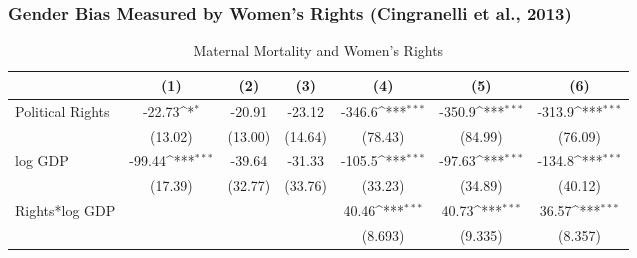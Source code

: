 \documentclass[10pt,letterpaper,subeqn]{beamer}
\begin{document}
\begin{frame}
\frametitle{Gender Bias Measured by  Women's Rights  (Cingranelli et al., 2013)}
%
\begin{table}[htbp]\centering
\def\sym#1{\ifmmode^{#1}\else\(^{#1}\)\fi}
\caption{Maternal Mortality and Women's Rights \label{MMRbWRightWDINew}}
\scriptsize
\begin{tabular}{l*{6}{c}}
\hline\hline
            &\multicolumn{1}{c}{(1)}&\multicolumn{1}{c}{(2)}&\multicolumn{1}{c}{(3)}&\multicolumn{1}{c}{(4)}&\multicolumn{1}{c}{(5)}&\multicolumn{1}{c}{(6)}\\
\hline
Political Rights      &      -22.73\sym{*}  &      -20.91         &      -23.12         &      -346.6\sym{***}&      -350.9\sym{***}&      -313.9\sym{***}\\
            &     (13.02)         &     (13.00)         &     (14.64)         &     (78.43)         &     (84.99)         &     (76.09)         \\

log GDP         &      -99.44\sym{***}&      -39.64         &      -31.33         &      -105.5\sym{***}&      -97.63\sym{***}&      -134.8\sym{***}\\
            &     (17.39)         &     (32.77)         &     (33.76)         &     (33.23)         &     (34.89)         &     (40.12)         \\


Rights*log GDP  &                     &                     &                     &       40.46\sym{***}&       40.73\sym{***}&       36.57\sym{***}\\
            &                     &                     &                     &     (8.693)         &     (9.335)         &     (8.357)         \\



\end{tabular}
\end{table}
\end{frame}
\end{document}
